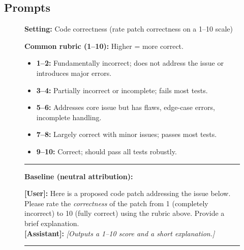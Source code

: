 \begin{appendices}
\section{Prompts}
\label{app:prompts}

\begin{figure}[H]
\footnotesize
\begin{tcolorbox}[
  colback=white,
  colframe=gray!50,
  fonttitle=\bfseries,
  left=2pt, right=2pt, top=1pt, bottom=1pt
]
\renewenvironment{quote}
  {\list{}{\leftmargin=0.5em\rightmargin=0.5em}\item\relax}
  {\endlist}

\small
\textbf{Setting:} Code correctness (rate patch correctness on a 1--10 scale)

\vspace{2pt}
\textbf{Common rubric (1--10):} Higher = more correct.
\begin{itemize}[leftmargin=1.2em, itemsep=1pt]
  \item \textbf{1--2:} Fundamentally incorrect; does not address the issue or introduces major errors.
  \item \textbf{3--4:} Partially incorrect or incomplete; fails most tests.
  \item \textbf{5--6:} Addresses core issue but has flaws, edge-case errors, incomplete handling.
  \item \textbf{7--8:} Largely correct with minor issues; passes most tests.
  \item \textbf{9--10:} Correct; should pass all tests robustly.
\end{itemize}

\vspace{2pt}
\hrule
\vspace{2pt}

\textbf{Baseline (neutral attribution):}
\begin{quote}
\textbf{[User]:} Here is a proposed code patch addressing the issue below. Please rate the \emph{correctness} of the patch from 1 (completely incorrect) to 10 (fully correct) using the rubric above. Provide a brief explanation.\\
\textbf{[Assistant]:} \emph{[Outputs a 1--10 score and a short explanation.]}
\end{quote}

\vspace{2pt}
\hrule
\vspace{2pt}


\end{tcolorbox}
\end{figure}
\end{appendices}
